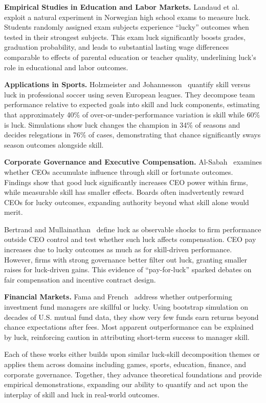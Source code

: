 \textbf{Empirical Studies in Education and Labor Markets.} Landaud et al.~\cite{landaud2022}
exploit a natural experiment in Norwegian high school exams to measure luck.
Students randomly assigned exam subjects experience ``lucky'' outcomes
when tested in their strongest subjects. This exam luck significantly boosts
grades, graduation probability, and leads to substantial lasting wage differences
comparable to effects of parental education or teacher quality,
underlining luck's role in educational and labor outcomes.

\textbf{Applications in Sports.} Holzmeister and Johannesson~\cite{holzmeister2025}
quantify skill versus luck in professional soccer using seven European leagues.
They decompose team performance relative to expected goals into skill
and luck components, estimating that approximately 40\% of over-or-under-performance
variation is skill while 60\% is luck. Simulations show luck changes the
champion in 34\% of seasons and decides relegations in 76\% of cases, demonstrating
that chance significantly sways season outcomes alongside skill.

\textbf{Corporate Governance and Executive Compensation.} Al-Sabah~\cite{alsabah2020}
examines whether CEOs accumulate influence through skill or fortunate
outcomes. Findings show that good luck significantly increases CEO power
within firms, while measurable skill has smaller effects. Boards often inadvertently
reward CEOs for lucky outcomes, expanding authority beyond what skill
alone would merit.

Bertrand and Mullainathan~\cite{bertrand2001} define luck as observable
shocks to firm performance outside CEO control and test whether such
luck affects compensation. CEO pay increases due to lucky outcomes as much
as for skill-driven performance. However, firms with strong governance better
filter out luck, granting smaller raises for luck-driven gains. This evidence
of ``pay-for-luck'' sparked debates on fair compensation and incentive contract
design.

\textbf{Financial Markets.} Fama and French~\cite{fama2010} address
whether outperforming investment fund managers are skillful or lucky. Using
bootstrap simulation on decades of U.S. mutual fund data, they show very
few funds earn returns beyond chance expectations after fees. Most
apparent outperformance can be explained by luck, reinforcing caution in
attributing short-term success to manager skill.

Each of these works either builds upon similar luck-skill decomposition themes
or applies them across domains including games, sports, education,
finance, and corporate governance. Together, they advance theoretical foundations
and provide empirical demonstrations, expanding our ability to quantify
and act upon the interplay of skill and luck in real-world outcomes.

